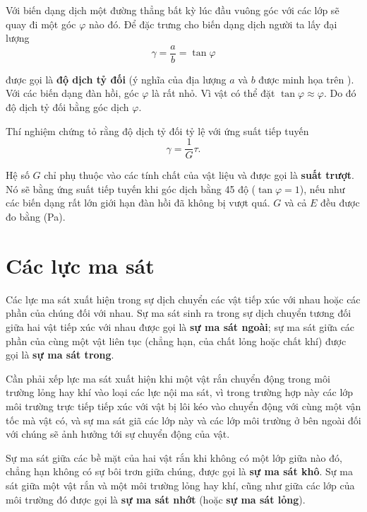 Với biến dạng dịch một đường thẳng bất kỳ lúc đầu vuông góc với các lớp sẽ quay đi một góc $\varphi$ nào đó. Để đặc trưng cho biến dạng dịch người ta lấy đại lượng
\begin{equation}\label{eq:2_33}
\gamma = \frac{a}{b} = \tan\varphi
\end{equation}

\noindent
được gọi là \textbf{độ dịch tỷ đối} (ý nghĩa của địa lượng $a$ và $b$ được minh họa trên ). Với các biến dạng đàn hồi, góc $\varphi$ là rất nhỏ. Vì vật có thể đặt $\tan\varphi\approx\varphi$. Do đó độ dịch tỷ đối bằng góc dịch $\varphi$.

Thí nghiệm chứng tỏ rằng độ dịch tỷ đối tỷ lệ với ứng suất tiếp tuyến
\vspace{-12pt}
\begin{equation}\label{eq:2_34}
\gamma = \frac{1}{G}\tau.
\end{equation}

\noindent
Hệ số $G$ chỉ phụ thuộc vào các tính chất của vật liệu và được gọi là \textbf{suất trượt}. Nó sẽ bằng ứng suất tiếp tuyến khi góc dịch bằng 45 độ ($\tan\varphi=1$), nếu như các biến dạng rất lớn giới hạn đàn hồi đã không bị vượt quá. $G$ và cả $E$ đều được đo bằng (\si{\pascal}).

\section{Các lực ma sát}\label{sec:2_10}

Các lực ma sát xuất hiện trong sự dịch chuyển các vật tiếp xúc với nhau hoặc các phần của chúng đối với nhau. Sự ma sát sinh ra trong sự dịch chuyển tương đối giữa hai vật tiếp xúc với nhau được gọi là \textbf{sự ma sát ngoài}; sự ma sát giữa các phần của cùng một vật liên tục (chẳng hạn, của chất lỏng hoặc chất khí) được gọi là \textbf{sự ma sát trong}.

Cần phải xếp lực ma sát xuất hiện khi một vật rắn chuyển động trong môi trường lỏng hay khí vào loại các lực nội ma sát, vì trong trường hợp này các lớp môi trường trực tiếp tiếp xúc với vật bị lôi kéo vào chuyển động với cùng một vận tốc mà vật có, và sự ma sát giã các lớp này và các lớp môi trường ở bên ngoài đối với chúng sẽ ảnh hưởng tới sự chuyển động của vật.

Sự ma sát giữa các bề mặt của hai vật rắn khi không có một lớp giữa nào đó, chẳng hạn không có sự bôi trơn giữa chúng, được gọi là \textbf{sự ma sát khô}. Sự ma sát giữa một vật rắn và một môi trường lỏng hay khí, cũng như giữa các lớp của môi trường đó được gọi là \textbf{sự ma sát nhớt} (hoặc \textbf{sự ma sát lỏng}).

